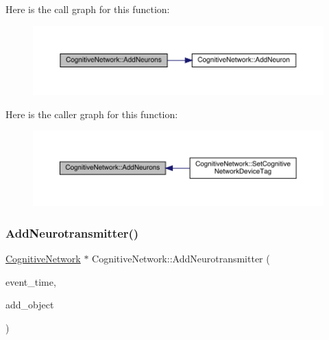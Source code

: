 Here is the call graph for this function\+:
\nopagebreak
\begin{figure}[H]
\begin{center}
\leavevmode
\includegraphics[width=350pt]{class_cognitive_network_ade928e3355db97d3c5d99501ff4a3b69_cgraph}
\end{center}
\end{figure}
Here is the caller graph for this function\+:
\nopagebreak
\begin{figure}[H]
\begin{center}
\leavevmode
\includegraphics[width=350pt]{class_cognitive_network_ade928e3355db97d3c5d99501ff4a3b69_icgraph}
\end{center}
\end{figure}
\mbox{\label{class_cognitive_network_ab80ffdc75ad4754463c356d36fb81ab4}} 
\subsubsection{\texorpdfstring{Add\+Neurotransmitter()}{AddNeurotransmitter()}}
{\footnotesize\ttfamily \hyperlink{class_cognitive_network}{Cognitive\+Network} $\ast$ Cognitive\+Network\+::\+Add\+Neurotransmitter (\begin{DoxyParamCaption}\item[{std\+::chrono\+::time\+\_\+point$<$ \hyperlink{universe_8h_a0ef8d951d1ca5ab3cfaf7ab4c7a6fd80}{Clock} $>$}]{event\+\_\+time,  }\item[{\hyperlink{class_cognitive_network}{Cognitive\+Network} $\ast$}]{add\+\_\+object }\end{DoxyParamCaption})}



